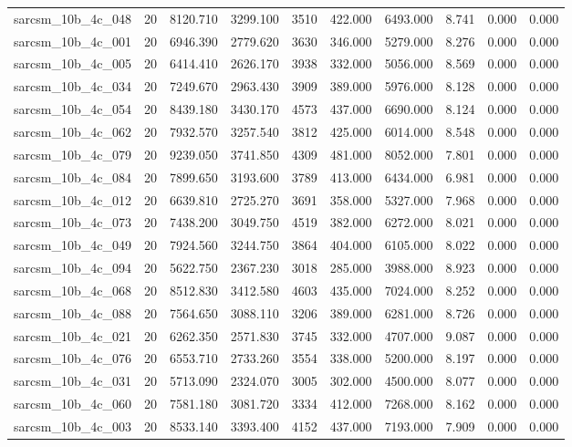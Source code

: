 \begin{tabular}{lrrrrrrrrr}
sarcsm\_10b\_4c\_048 & 20 & 8120.710 & 3299.100 & 3510 & 422.000 & 6493.000 & 8.741 & 0.000 & 0.000 \\
sarcsm\_10b\_4c\_001 & 20 & 6946.390 & 2779.620 & 3630 & 346.000 & 5279.000 & 8.276 & 0.000 & 0.000 \\
sarcsm\_10b\_4c\_005 & 20 & 6414.410 & 2626.170 & 3938 & 332.000 & 5056.000 & 8.569 & 0.000 & 0.000 \\
sarcsm\_10b\_4c\_034 & 20 & 7249.670 & 2963.430 & 3909 & 389.000 & 5976.000 & 8.128 & 0.000 & 0.000 \\
sarcsm\_10b\_4c\_054 & 20 & 8439.180 & 3430.170 & 4573 & 437.000 & 6690.000 & 8.124 & 0.000 & 0.000 \\
sarcsm\_10b\_4c\_062 & 20 & 7932.570 & 3257.540 & 3812 & 425.000 & 6014.000 & 8.548 & 0.000 & 0.000 \\
sarcsm\_10b\_4c\_079 & 20 & 9239.050 & 3741.850 & 4309 & 481.000 & 8052.000 & 7.801 & 0.000 & 0.000 \\
sarcsm\_10b\_4c\_084 & 20 & 7899.650 & 3193.600 & 3789 & 413.000 & 6434.000 & 6.981 & 0.000 & 0.000 \\
sarcsm\_10b\_4c\_012 & 20 & 6639.810 & 2725.270 & 3691 & 358.000 & 5327.000 & 7.968 & 0.000 & 0.000 \\
sarcsm\_10b\_4c\_073 & 20 & 7438.200 & 3049.750 & 4519 & 382.000 & 6272.000 & 8.021 & 0.000 & 0.000 \\
sarcsm\_10b\_4c\_049 & 20 & 7924.560 & 3244.750 & 3864 & 404.000 & 6105.000 & 8.022 & 0.000 & 0.000 \\
sarcsm\_10b\_4c\_094 & 20 & 5622.750 & 2367.230 & 3018 & 285.000 & 3988.000 & 8.923 & 0.000 & 0.000 \\
sarcsm\_10b\_4c\_068 & 20 & 8512.830 & 3412.580 & 4603 & 435.000 & 7024.000 & 8.252 & 0.000 & 0.000 \\
sarcsm\_10b\_4c\_088 & 20 & 7564.650 & 3088.110 & 3206 & 389.000 & 6281.000 & 8.726 & 0.000 & 0.000 \\
sarcsm\_10b\_4c\_021 & 20 & 6262.350 & 2571.830 & 3745 & 332.000 & 4707.000 & 9.087 & 0.000 & 0.000 \\
sarcsm\_10b\_4c\_076 & 20 & 6553.710 & 2733.260 & 3554 & 338.000 & 5200.000 & 8.197 & 0.000 & 0.000 \\
sarcsm\_10b\_4c\_031 & 20 & 5713.090 & 2324.070 & 3005 & 302.000 & 4500.000 & 8.077 & 0.000 & 0.000 \\
sarcsm\_10b\_4c\_060 & 20 & 7581.180 & 3081.720 & 3334 & 412.000 & 7268.000 & 8.162 & 0.000 & 0.000 \\
sarcsm\_10b\_4c\_003 & 20 & 8533.140 & 3393.400 & 4152 & 437.000 & 7193.000 & 7.909 & 0.000 & 0.000 \\

\end{tabular}
